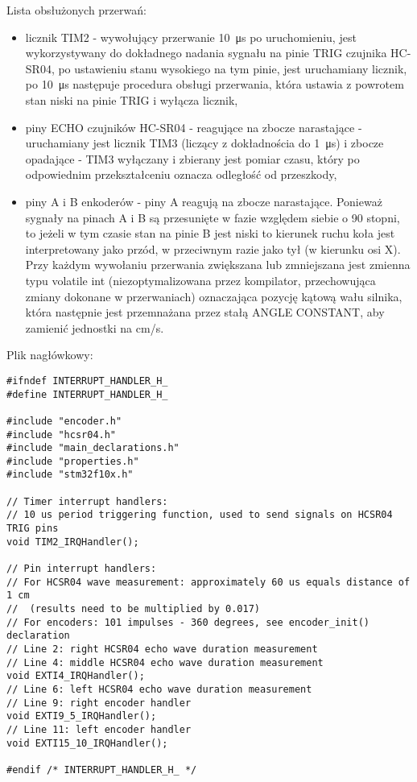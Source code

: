 \documentclass[a4paper,12pt,twoside,openany]{report}
\begin{document}
\newpage
\noindent Lista obsłużonych przerwań:
\begin{itemize}
\item licznik TIM2 - wywołujący przerwanie \SI{10}{\micro s} po uruchomieniu, jest wykorzystywany do dokładnego nadania sygnału na pinie TRIG czujnika HC-SR04, po ustawieniu stanu wysokiego na tym pinie, jest uruchamiany licznik, po \SI{10}{\micro s} następuje procedura obsługi przerwania, która ustawia z powrotem stan niski na pinie TRIG i wyłącza licznik,
\item piny ECHO czujników HC-SR04 - reagujące na zbocze narastające - uruchamiany jest licznik TIM3 (liczący z dokładnościa do \SI{1}{\micro s}) i zbocze opadające - TIM3 wyłączany i zbierany jest pomiar czasu, który po odpowiednim przekształceniu oznacza odległość od przeszkody,
\item piny A i B enkoderów - piny A reagują na zbocze narastające. Ponieważ sygnały na pinach A i B są przesunięte w fazie względem siebie o 90 stopni, to jeżeli w tym czasie stan na pinie B jest niski to kierunek ruchu koła jest interpretowany jako przód, w przeciwnym razie jako tył (w kierunku osi X). Przy każdym wywołaniu przerwania zwiększana lub zmniejszana jest zmienna typu volatile int (niezoptymalizowana przez kompilator, przechowująca zmiany dokonane w przerwaniach) oznaczająca pozycję kątową wału silnika, która następnie jest przemnażana przez stałą ANGLE CONSTANT, aby zamienić jednostki na cm/s.
\end{itemize}
Plik nagłówkowy:\\
\begin{lstlisting}[style=customc]
#ifndef INTERRUPT_HANDLER_H_
#define INTERRUPT_HANDLER_H_

#include "encoder.h"
#include "hcsr04.h"
#include "main_declarations.h"
#include "properties.h"
#include "stm32f10x.h"

// Timer interrupt handlers:
// 10 us period triggering function, used to send signals on HCSR04 TRIG pins
void TIM2_IRQHandler();

// Pin interrupt handlers:
// For HCSR04 wave measurement: approximately 60 us equals distance of 1 cm
//  (results need to be multiplied by 0.017)
// For encoders: 101 impulses - 360 degrees, see encoder_init() declaration
// Line 2: right HCSR04 echo wave duration measurement
// Line 4: middle HCSR04 echo wave duration measurement
void EXTI4_IRQHandler();
// Line 6: left HCSR04 echo wave duration measurement
// Line 9: right encoder handler
void EXTI9_5_IRQHandler();
// Line 11: left encoder handler
void EXTI15_10_IRQHandler();

#endif /* INTERRUPT_HANDLER_H_ */


\end{lstlisting}
\end{document}
